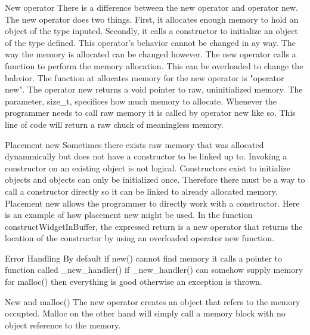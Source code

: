 \documentclass[letterpaper, 12pt]{article}
\begin{document}
	New operator
	There is a difference between the new operator and operator new. The new operator does two things.
	First, it allocates enough memory to hold an object of the type inputed. Secondly, it calls a constructor to initialize an object of 		the type defined. This operator's behavior cannot be changed in ay way. The way the memory is allocated can be changed 			however. The new operator calls a function to perform the memory allocation. This can be overloaded to change the bahvior. 			The function at allocates memory for the new operator is "operator new".
	The operator new returns a void pointer to raw, uninitialized memory. The parameter, size_t, specifices how much memory to allocate. Whenever the programmer needs to call raw memory it is called by operator new like so.
	This line of code will return a raw chuck of meaningless memory.

	Placement new
	Sometimes there exists raw memory that was allocated dynammically but does not have a constructor to be linked up to. Invoking a constructor on an existing object is not logical. Constructors exist to initialize objects and objects can only be initialized once. Therefore there must be a way to call a constructor directly so it can be linked to already allocated memory. Placement new allows the programmer to directly work with a constructor. Here is an example of how placement new might be used.
	In the function constructWidgetInBuffer, the expressed return is a new operator that returns the location of the constructor by using an overloaded operator new function.

	Error Handling
	By default if new() cannot find memory it calls a pointer to function called _new_handler()
	if _new_handler() can somehow supply memory for malloc() then everything is good otherwise an exception is thrown.

	New and malloc()
	The new operator creates an object that refers to the memory occupted. Malloc on the other hand will simply call a memory block with no object reference to the memory.
\end{document}
